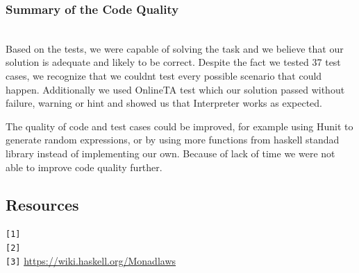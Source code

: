 \documentclass[11pt]{article}
\begin{document}
\subsubsection{Summary of the Code Quality} \\
Based on the tests, we were capable of solving the task and we believe that our solution is adequate and likely to be correct. Despite the fact we tested 37 test cases, we recognize that we couldnt test every possible scenario that could happen. Additionally we used OnlineTA test which our solution passed without failure, warning or hint and showed us that Interpreter works as expected.

The quality of code and test cases could be improved, for example using Hunit to generate random expressions, or by using more functions from haskell standad library instead of implementing our own. Because of lack of time we were not able to improve code quality further.

\subsection{Resources}
\texttt{[1]} \href{https://en.wikibooks.org/wiki/Haskell/Understanding\_monads/State}
\\
\texttt{[2]} \href{https://hkupty.github.io/2016/Understanding-the-math-behind-fp-monads/}
\\
\texttt{[3]} \href{}{https://wiki.haskell.org/Monad\textunderscore{}laws}
\end{document}
